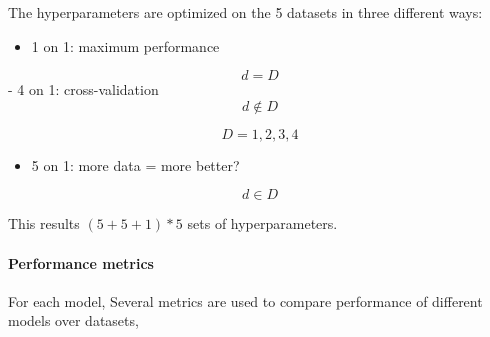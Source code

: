\documentclass[
]{article}
\providecommand{\tightlist}{%
  \setlength{\itemsep}{0pt}\setlength{\parskip}{0pt}}
\begin{document}
The hyperparameters are optimized on the 5 datasets in three different
ways:

\begin{itemize}
\tightlist
\item
  1 on 1: maximum performance
\end{itemize}

\[ d = D \] - 4 on 1: cross-validation \[ d \notin D\]

\[ D = {1, 2, 3, 4}\]

\begin{itemize}
\tightlist
\item
  5 on 1: more data = more better?
\end{itemize}

\[ d \in D \]

This results \((5+5+1)*5\) sets of hyperparameters.

\hypertarget{performance-metrics}{%
\paragraph{Performance metrics}\label{performance-metrics}}

For each model, Several metrics are used to compare performance of
different models over datasets,
\end{document}

